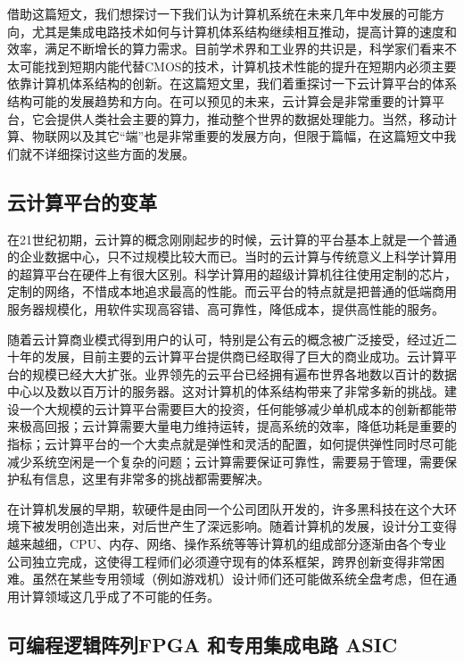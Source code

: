 借助这篇短文，我们想探讨一下我们认为计算机系统在未来几年中发展的可能方向，尤其是集成电路技术如何与计算机体系结构继续相互推动，提高计算的速度和效率，满足不断增长的算力需求。目前学术界和工业界的共识是，科学家们看来不太可能找到短期内能代替CMOS的技术，计算机技术性能的提升在短期内必须主要依靠计算机体系结构的创新。在这篇短文里，我们着重探讨一下云计算平台的体系结构可能的发展趋势和方向。在可以预见的未来，云计算会是非常重要的计算平台，它会提供人类社会主要的算力，推动整个世界的数据处理能力。当然，移动计算、物联网以及其它“端”也是非常重要的发展方向，但限于篇幅，在这篇短文中我们就不详细探讨这些方面的发展。

\subsection{云计算平台的变革}

在21世纪初期，云计算的概念刚刚起步的时候，云计算的平台基本上就是一个普通的企业数据中心，只不过规模比较大而已。当时的云计算与传统意义上科学计算用的超算平台在硬件上有很大区别。科学计算用的超级计算机往往使用定制的芯片，定制的网络，不惜成本地追求最高的性能。而云平台的特点就是把普通的低端商用服务器规模化，用软件实现高容错、高可靠性，降低成本，提供高性能的服务。

随着云计算商业模式得到用户的认可，特别是公有云的概念被广泛接受，经过近二十年的发展，目前主要的云计算平台提供商已经取得了巨大的商业成功。云计算平台的规模已经大大扩张。业界领先的云平台已经拥有遍布世界各地数以百计的数据中心以及数以百万计的服务器。这对计算机的体系结构带来了非常多新的挑战。建设一个大规模的云计算平台需要巨大的投资，任何能够减少单机成本的创新都能带来极高回报；云计算需要大量电力维持运转，提高系统的效率，降低功耗是重要的指标；云计算平台的一个大卖点就是弹性和灵活的配置，如何提供弹性同时尽可能减少系统空闲是一个复杂的问题；云计算需要保证可靠性，需要易于管理，需要保护私有信息，这里有非常多的挑战都需要解决。

在计算机发展的早期，软硬件是由同一个公司团队开发的，许多黑科技在这个大环境下被发明创造出来，对后世产生了深远影响。随着计算机的发展，设计分工变得越来越细，CPU、内存、网络、操作系统等等计算机的组成部分逐渐由各个专业公司独立完成，这使得工程师们必须遵守现有的体系框架，跨界创新变得非常困难。虽然在某些专用领域（例如游戏机）设计师们还可能做系统全盘考虑，但在通用计算领域这几乎成了不可能的任务。


\subsection{可编程逻辑阵列FPGA 和专用集成电路 ASIC}

